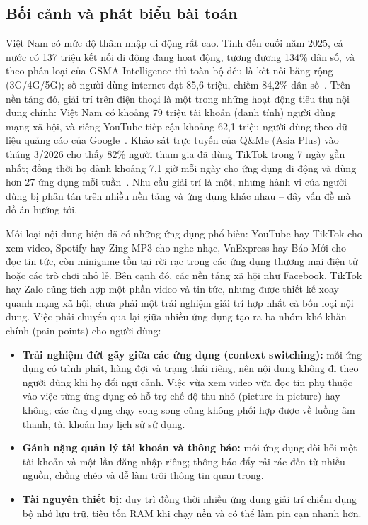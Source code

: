 \subsection{Bối cảnh và phát biểu bài toán}
\label{sec:problem-statement}

Việt Nam có mức độ thâm nhập di động rất cao. Tính đến cuối năm 2025, cả nước có 137 triệu kết nối di động đang hoạt động, tương đương 134\% dân số, và theo phân loại của GSMA Intelligence thì toàn bộ đều là kết nối băng rộng (3G/4G/5G); số người dùng internet đạt 85,6 triệu, chiếm 84,2\% dân số~\cite{datareportal2026vn}. Trên nền tảng đó, giải trí trên điện thoại là một trong những hoạt động tiêu thụ nội dung chính: Việt Nam có khoảng 79 triệu tài khoản (danh tính) người dùng mạng xã hội, và riêng YouTube tiếp cận khoảng 62,1 triệu người dùng theo dữ liệu quảng cáo của Google~\cite{datareportal2026vn}. %
Khảo sát trực tuyến của Q\&Me (Asia Plus) vào tháng 3/2026 cho thấy 82\% người tham gia đã dùng TikTok trong 7 ngày gần nhất; đồng thời họ dành khoảng 7,1 giờ mỗi ngày cho ứng dụng di động và dùng hơn 27 ứng dụng mỗi tuần~\cite{qandme-vietnam-2026}. Nhu cầu giải trí là một, nhưng hành vi của người dùng bị phân tán trên nhiều nền tảng và ứng dụng khác nhau -- đây vấn đề mà đồ án hướng tới.

Mỗi loại nội dung hiện đã có những ứng dụng phổ biến: YouTube hay TikTok cho xem video, Spotify hay Zing MP3 cho nghe nhạc, VnExpress hay Báo Mới cho đọc tin tức, còn minigame tồn tại rời rạc trong các ứng dụng thương mại điện tử hoặc các trò chơi nhỏ lẻ. Bên cạnh đó, các nền tảng xã hội như Facebook, TikTok hay Zalo cũng tích hợp một phần video và tin tức, nhưng được thiết kế xoay quanh mạng xã hội, chưa phải một trải nghiệm giải trí hợp nhất cả bốn loại nội dung. Việc phải chuyển qua lại giữa nhiều ứng dụng tạo ra ba nhóm khó khăn chính (pain points) cho người dùng:

\begin{itemize}
    \item \textbf{Trải nghiệm đứt gãy giữa các ứng dụng (context switching):} mỗi ứng dụng có trình phát, hàng đợi và trạng thái riêng, nên nội dung không đi theo người dùng khi họ đổi ngữ cảnh. Việc vừa xem video vừa đọc tin phụ thuộc vào việc từng ứng dụng có hỗ trợ chế độ thu nhỏ (picture-in-picture) hay không; các ứng dụng chạy song song cũng không phối hợp được về luồng âm thanh, tài khoản hay lịch sử sử dụng.
    \item \textbf{Gánh nặng quản lý tài khoản và thông báo:} mỗi ứng dụng đòi hỏi một tài khoản và một lần đăng nhập riêng; thông báo đẩy rải rác đến từ nhiều nguồn, chồng chéo và dễ làm trôi thông tin quan trọng.
    \item \textbf{Tài nguyên thiết bị:} duy trì đồng thời nhiều ứng dụng giải trí chiếm dụng bộ nhớ lưu trữ, tiêu tốn RAM khi chạy nền và có thể làm pin cạn nhanh hơn.
\end{itemize}

